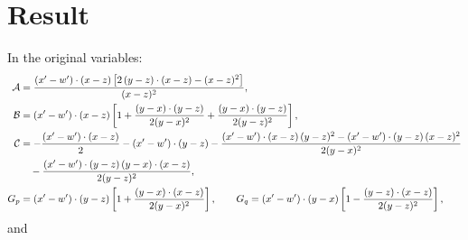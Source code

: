 \documentclass[10pt]{article}
\begin{document}
\section*{Result}
In the original variables:
\begin{align}
\mathcal{A}&=\frac{(x'-w')\cdot(x-z)\,\big[2\,(y-z)\cdot(x-z)-(x-z)^{2}\big]}{(x-z)^{2}},\notag\\
\mathcal{B}&=(x'-w')\cdot(x-z)\left[1+\frac{(y-x)\cdot(y-z)}{2(y-x)^{2}}+\frac{(y-x)\cdot(y-z)}{2(y-z)^{2}}\right],\notag\\
\mathcal{C}&=-\frac{(x'-w')\cdot(x-z)}{2}-(x'-w')\cdot(y-z)-\frac{(x'-w')\cdot(x-z)\,(y-z)^{2}-(x'-w')\cdot(y-z)\,(x-z)^{2}}{2(y-x)^{2}}\notag\\
&\quad-\frac{(x'-w')\cdot(y-z)\,(y-x)\cdot(x-z)}{2(y-z)^{2}},\notag\\
G_{p}&=(x'-w')\cdot(y-z)\left[1+\frac{(y-x)\cdot(x-z)}{2(y-x)^{2}}\right],\qquad
G_{q}=(x'-w')\cdot(y-x)\left[1-\frac{(y-z)\cdot(x-z)}{2(y-z)^{2}}\right],
\end{align}
and
\end{document}
